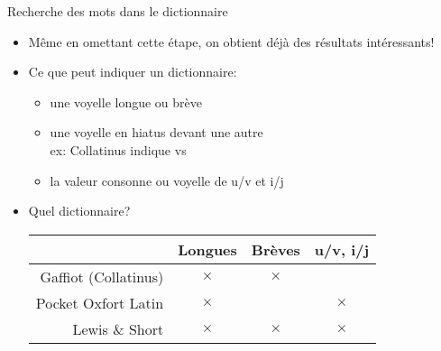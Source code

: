 \documentclass{beamer}
\newcommand{\latin}[1]{\structure{#1}}
\newcommand{\crx}{$\times$}
\begin{document}
\begin{frame}{Recherche des mots dans le dictionnaire}  %

\begin{itemize}
\item Même en omettant cette étape, on obtient déjà des résultats intéressants!

\vfill

\item Ce que peut indiquer un dictionnaire:

\begin{itemize}
\item une voyelle longue ou brève 
\item une voyelle en hiatus devant une autre \\
ex: Collatinus indique \latin{m{\u e}us} vs \latin{seu}
\item la valeur consonne ou voyelle de u/v et i/j
\end{itemize}

\vfill

\item Quel dictionnaire?

\begin{tabular}{r c c c}
				& Longues & Brèves & u/v, i/j \\
\hline
Gaffiot (Collatinus)		& \crx    & \crx   &  \\
Pocket Oxfort Latin & \crx &       & \crx \\
Lewis \& Short	& \crx    & \crx   & \crx \\
\hline
\end{tabular}


\end{itemize}

\end{frame} %
\end{document}
